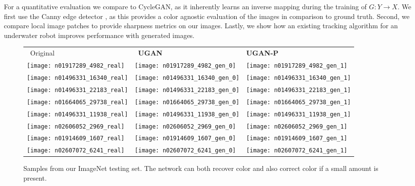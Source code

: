 For a quantitative evaluation we compare to CycleGAN, as it inherently learns an inverse mapping during the training of
$G: Y \rightarrow X$. We first use the Canny edge detector
\cite{canny1986computational}, as this provides a color agnostic evaluation of the images in comparison to ground truth.
Second, we compare local image patches to provide sharpness metrics on our images. Lastly, we show how an existing
tracking algorithm for an underwater robot improves performance with generated images.

\begin{figure}[th]
\centering
\begin{tabular}{p{1.7cm} p{1.7cm} p{1.75cm}}

   ~\quad Original & ~\quad \textbf{UGAN} & \quad \textbf{UGAN-P} \\

   \texttt{[image: n01917289\_4982\_real]} &
   \texttt{[image: n01917289\_4982\_gen\_0]} &
   \texttt{[image: n01917289\_4982\_gen\_1]} \\

   \texttt{[image: n01496331\_16340\_real]} &
   \texttt{[image: n01496331\_16340\_gen\_0]} &
   \texttt{[image: n01496331\_16340\_gen\_1]} \\
   
   \texttt{[image: n01496331\_22183\_real]} &
   \texttt{[image: n01496331\_22183\_gen\_0]} &
   \texttt{[image: n01496331\_22183\_gen\_1]} \\
   
   \texttt{[image: n01664065\_29738\_real]} &
   \texttt{[image: n01664065\_29738\_gen\_0]} &
   \texttt{[image: n01664065\_29738\_gen\_1]} \\
   
   \texttt{[image: n01496331\_11938\_real]} &
   \texttt{[image: n01496331\_11938\_gen\_0]} &
   \texttt{[image: n01496331\_11938\_gen\_1]} \\
   
   \texttt{[image: n02606052\_2969\_real]} &
   \texttt{[image: n02606052\_2969\_gen\_0]} &
   \texttt{[image: n02606052\_2969\_gen\_1]} \\
   
   \texttt{[image: n01914609\_1607\_real]} &
   \texttt{[image: n01914609\_1607\_gen\_0]} &
   \texttt{[image: n01914609\_1607\_gen\_1]} \\

   \texttt{[image: n02607072\_6241\_real]} &
   \texttt{[image: n02607072\_6241\_gen\_0]} &
   \texttt{[image: n02607072\_6241\_gen\_1]} \\

\end{tabular}
\caption{Samples from our ImageNet testing set. The network can both recover color and also correct color if a small amount is 
present.}
\label{fig:test_samples}
\end{figure}

